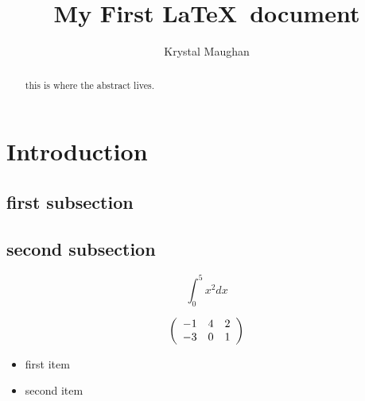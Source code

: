 \documentclass[12pt,a4paper]{article}
\author{Krystal Maughan}
\title{My First \LaTeX\ document}
\begin{document}
	
	\maketitle
	
	\begin{abstract}
		this is where the abstract lives.
	\end{abstract}
\section{Introduction}
\subsection{first subsection}
\subsection{second subsection}

\[
\int_0^5 x^2 dx
\]

\[
\left(
\begin{array}{c c c}
-1 & 4 & 2 \\
-3 & 0 & 1
\end{array}
\right)
\]

\begin{itemize}
	\item
	first item
	\item 
	second item
\end{itemize}
\end{document}

